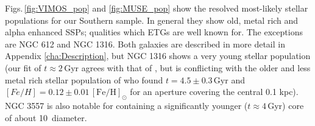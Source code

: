 		Figs.\,\ref{fig:VIMOS_pop} and \ref{fig:MUSE_pop} show the resolved most-likely stellar populations for our Southern sample. In general they show old, metal rich and alpha enhanced SSPs; qualities which ETGs are well known for. The exceptions are NGC 612 and NGC 1316. Both galaxies are described in more detail in Appendix \ref{cha:Description}, but NGC 1316 shows a very young stellar population (our fit of $t \approx 2$\,Gyr agrees with that of \citealt{Kuntschner2000}, but is conflicting with the older and less metal rich stellar population of \citealt{Koleva2011} who found $t=4.5 \pm 0.3 \,\mathrm{Gyr}$ and $[Fe/H]=0.12 \pm 0.01 \,\mathrm{[Fe/H]_\odot}$ for an aperture covering the central 0.1 kpc). NGC 3557 is also notable for containing a significantly younger ($t\approx 4$\,Gyr) core of about 10\arcsec\ diameter. 

